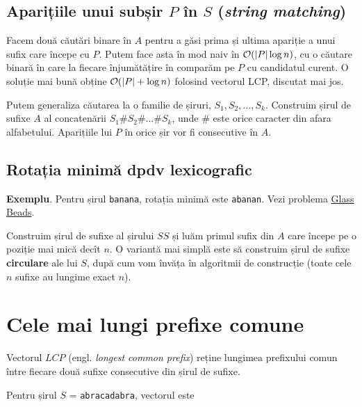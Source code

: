 \documentclass[../main.tex]{subfiles}
\begin{document}
\subsection{Aparițiile unui subșir \texorpdfstring{$P$}{P} în \texorpdfstring{$S$}{S} (\textit{string matching})}

Facem două căutări binare în $A$ pentru a găsi prima și ultima apariție a unui sufix care începe cu $P$. Putem face asta în mod naiv în $\mathcal{O}(|P| \log n)$, cu o căutare binară în care la fiecare înjumătățire în comparăm pe $P$ cu candidatul curent. O soluție mai bună obține $\mathcal{O}(|P| + \log n)$ folosind vectorul LCP, discutat mai jos.

Putem generaliza căutarea la o familie de șiruri, $S_1, S_2, \dots, S_k$. Construim șirul de sufixe $A$ al concatenării $S_1\#S_2\#\dots\#S_k$, unde $\#$ este orice caracter din afara alfabetului. Aparițiile lui $P$ în orice șir vor fi consecutive în $A$.

\subsection{Rotația minimă dpdv lexicografic}

\textbf{Exemplu}. Pentru șirul \texttt{banana}, rotația minimă este \texttt{abanan}. Vezi problema \href{https://onlinejudge.org/index.php?option=onlinejudge\&page=show_problem\&problem=660}{Glass Beads}.

Construim șirul de sufixe al șirului $SS$ și luăm primul sufix din $A$ care începe pe o poziție mai mică decît $n$. O variantă mai simplă este să construim șirul de sufixe \textbf{circulare} ale lui $S$, după cum vom învăța în algoritmii de construcție (toate cele $n$ sufixe au lungime exact $n$).

\section{Cele mai lungi prefixe comune}

\begin{definition}
  Vectorul $LCP$ (engl. \textit{longest common prefix}) reține lungimea prefixului comun între fiecare două sufixe consecutive din șirul de sufixe.
\end{definition}

Pentru șirul $S$ = \texttt{abracadabra}, vectorul este
\end{document}
